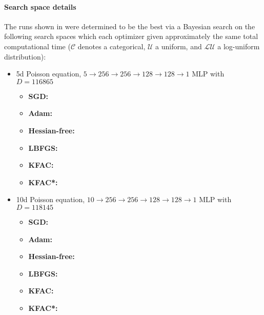 \paragraph{Search space details} The runs shown in  were determined to be the best via a Bayesian search on the following search spaces which each optimizer given approximately the same total computational time ($\mathcal{C}$ denotes a categorical, $\mathcal{U}$ a uniform, and $\mathcal{LU}$ a log-uniform distribution):
\begin{itemize}

\item 5d Poisson equation, $5 \to 256 \to 256 \to 128 \to 128 \to 1$ MLP with $D=\num{116865}$
  \begin{itemize}
    \def\pathToRuns{../kfac_pinns_exp/exp26_poisson5d_mlp_tanh_256_bayes/tex}
  \item \textbf{SGD:} 
  \item \textbf{Adam:} 
  \item \textbf{Hessian-free:} 
  \item \textbf{LBFGS:} 
  \item \textbf{KFAC:} 
  \item \textbf{KFAC*:} 
  \end{itemize}

\item 10d Poisson equation, $10 \to 256 \to 256 \to 128 \to 128 \to 1$ MLP with $D=\num{118145}$
  \begin{itemize}
    \def\pathToRuns{../kfac_pinns_exp/exp32_poisson10d_mlp_tanh_256_bayes/tex}
  \item \textbf{SGD:} 
  \item \textbf{Adam:} 
  \item \textbf{Hessian-free:} 
  \item \textbf{LBFGS:} 
  \item \textbf{KFAC:} 
  \item \textbf{KFAC*:} 
  \end{itemize}


\end{itemize}
